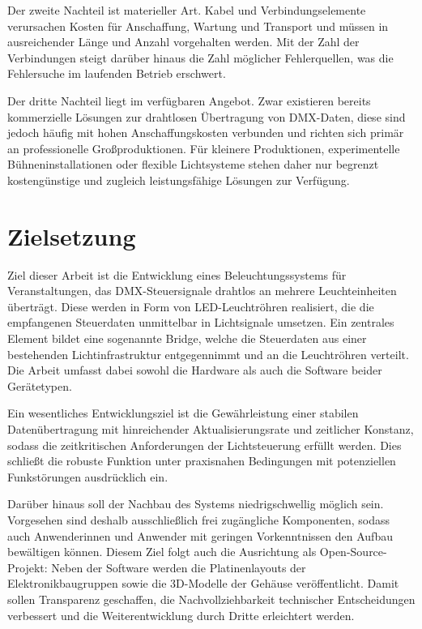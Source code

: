 Der zweite Nachteil ist materieller Art. Kabel und Verbindungselemente
verursachen Kosten für Anschaffung, Wartung und Transport und müssen in
ausreichender Länge und Anzahl vorgehalten werden. Mit der Zahl der Verbindungen
steigt darüber hinaus die Zahl möglicher Fehlerquellen, was die Fehlersuche im
laufenden Betrieb erschwert.

Der dritte Nachteil liegt im verfügbaren Angebot. Zwar existieren bereits
kommerzielle Lösungen zur drahtlosen Übertragung von DMX-Daten, diese sind jedoch
häufig mit hohen Anschaffungskosten verbunden und richten sich primär an
professionelle Großproduktionen. Für kleinere Produktionen, experimentelle
Bühneninstallationen oder flexible Lichtsysteme stehen daher nur begrenzt
kostengünstige und zugleich leistungsfähige Lösungen zur Verfügung.

\section{Zielsetzung}
\label{sec:zielsetzung}

Ziel dieser Arbeit ist die Entwicklung eines Beleuchtungssystems für
Veranstaltungen, das DMX-Steuersignale drahtlos an mehrere Leuchteinheiten
überträgt. Diese werden in Form von LED-Leuchtröhren realisiert, die die
empfangenen Steuerdaten unmittelbar in Lichtsignale umsetzen. Ein zentrales
Element bildet eine sogenannte Bridge, welche die Steuerdaten aus einer
bestehenden Lichtinfrastruktur entgegennimmt und an die Leuchtröhren verteilt.
Die Arbeit umfasst dabei sowohl die Hardware als auch die Software beider
Gerätetypen.

Ein wesentliches Entwicklungsziel ist die Gewährleistung einer stabilen
Datenübertragung mit hinreichender Aktualisierungsrate und zeitlicher Konstanz,
sodass die zeitkritischen Anforderungen der Lichtsteuerung erfüllt werden. Dies
schließt die robuste Funktion unter praxisnahen Bedingungen mit potenziellen
Funkstörungen ausdrücklich ein.

Darüber hinaus soll der Nachbau des Systems niedrigschwellig möglich sein.
Vorgesehen sind deshalb ausschließlich frei zugängliche Komponenten, sodass auch
Anwenderinnen und Anwender mit geringen Vorkenntnissen den Aufbau bewältigen
können. Diesem Ziel folgt auch die Ausrichtung als Open-Source-Projekt: Neben der
Software werden die Platinenlayouts der Elektronikbaugruppen sowie die 3D-Modelle
der Gehäuse veröffentlicht. Damit sollen Transparenz geschaffen, die
Nachvollziehbarkeit technischer Entscheidungen verbessert und die
Weiterentwicklung durch Dritte erleichtert werden.

